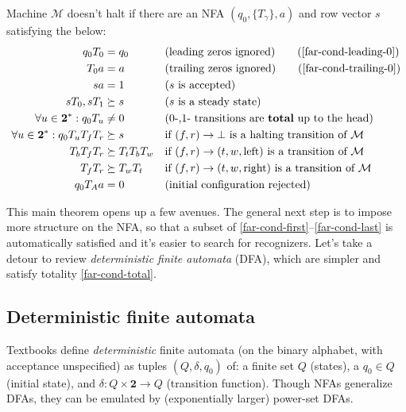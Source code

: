 \begin{theorem}\normalfont
  \label{far-main-theorem}
  Machine $\mathcal{M}$ doesn't halt if there are an NFA $(q_0, \{T_\gamma\}, a)$ and row vector $s$ satisfying the below:
  \begin{align}
    \label{far-cond-first}
    q_0 T_0 &= q_0
    &&\text{(leading zeros ignored)}
    \tag{\ref{far-cond-leading-0}}
    \\
    T_0 a &= a
    &&\text{(trailing zeros ignored)}
    \tag{\ref{far-cond-trailing-0}}
    \\
    sa &= 1
    &&\text{($s$ is accepted)}
    \label{far-cond-ass-accepted}
    \\
    sT_0,sT_1 &\succeq s
    &&\text{($s$ is a steady state)}
    \label{far-cond-ass-steady}
    \\
    \forall u\in\mathbf{2}^*: q_0 T_u &\neq 0
    &&\text{(0-,1- transitions are \textbf{total} up to the head)}
    \label{far-cond-total}
    \\
    \forall u\in\mathbf{2}^*: q_0T_u T_f T_r &\succeq s
    &&\text{if $(f,r) \to \bot$ is a halting transition of $\mathcal{M}$}
    \label{far-cond-halt}
    \\
    T_b T_f T_r &\succeq T_t T_b T_w
    &&\text{if $(f,r) \to (t,w,\text{left})$ is a transition of $\mathcal{M}$}
    \label{far-cond-left}
    \\
    T_f T_r &\succeq T_w T_t
    &&\text{if $(f,r) \to (t,w,\text{right})$ is a transition of $\mathcal{M}$}
    \label{far-cond-last}
    \\
    q_0 T_A a &= 0
    &&\text{(initial configuration rejected)}
    \label{far-cond-reject-start}
  \end{align}
\end{theorem}

This main theorem opens up a few avenues.
The general next step is to impose more structure on the NFA, so that a subset of \eqref{far-cond-first}--\eqref{far-cond-last} is automatically satisfied and it's easier to search for recognizers.
Let's take a detour to review \emph{deterministic finite automata} (DFA), which are simpler and satisfy totality \eqref{far-cond-total}.


\subsection{Deterministic finite automata}
\label{far-defs-dfa}
Textbooks define \emph{deterministic} finite automata (on the binary alphabet, with acceptance unspecified) as tuples $(Q, \delta, q_0)$ of: a finite set $Q$ (states), a $q_0\in Q$ (initial state), and $\delta: Q\times\mathbf{2}\to Q$ (transition function).
Though NFAs generalize DFAs, they can be emulated by (exponentially larger) power-set DFAs.

